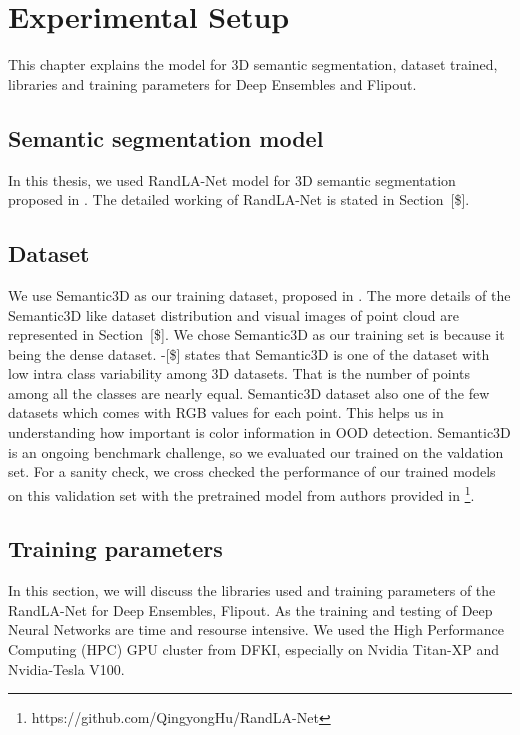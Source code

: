 

    \chapter{Experimental Setup}
    This chapter explains the model for 3D semantic segmentation, dataset trained, libraries and training parameters for Deep Ensembles and Flipout.

    \section{Semantic segmentation model}
    In this thesis, we used RandLA-Net model for 3D semantic segmentation proposed in \cite{Hu_2020_CVPR_Randla}.
    The detailed working of RandLA-Net is stated in Section~[\$].
    
    \section{Dataset}
    We use Semantic3D as our training dataset, proposed in \cite{hackel2017semantic3d}.
    The more details of the Semantic3D like dataset distribution and visual images of point cloud are represented in Section~[\$].
    We chose Semantic3D as our training set is because it being the dense dataset.
    \cite{}-[\$] states that Semantic3D is one of the dataset with low intra class variability among 3D datasets.
    That is the number of points among all the classes are nearly equal.
    Semantic3D dataset also one of the few datasets which comes with RGB values for each point.
    This helps us in understanding how important is color information in OOD detection.
    Semantic3D is an ongoing benchmark challenge, so we evaluated our trained on the valdation set.
    For a sanity check, we cross checked the performance of our trained models on this validation set with the pretrained model from authors provided in \footnote[1]{https://github.com/QingyongHu/RandLA-Net}.

    \section{Training parameters}
    In this section, we will discuss the libraries used and training parameters of the RandLA-Net for Deep Ensembles, Flipout.
    As the training and testing of Deep Neural Networks are time and resourse intensive.
    We used the High Performance Computing (HPC) GPU cluster from DFKI, especially on Nvidia Titan-XP and Nvidia-Tesla V100.
